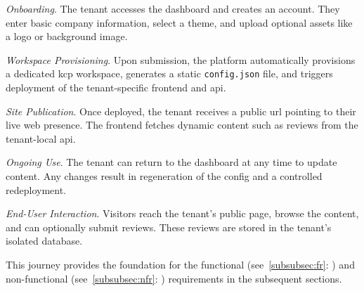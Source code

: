 \documentclass[11pt, a4paper, oneside, listof=totoc]{scrartcl}
\newcommand{\see}[1]{(see~\autoref{#1}: \textit{\nameref{#1}})}
\begin{document}
                \begin{enumerate}[label={[\arabic*]:},
                    ref=Challenge~\arabic*,
                    leftmargin=*,
                    itemsep=0.6\baselineskip]

                    \item\label{chal:ujOnboarding}
                        \textit{Onboarding}.
                        The tenant accesses the dashboard and creates an account.
                        They enter basic company information, select a theme, and upload optional
                        assets like a logo or background image.

                    \item\label{chal:ujProvisioning}
                        \textit{Workspace Provisioning}.
                        Upon submission, the platform automatically provisions a dedicated \gls{kcp}
                        workspace, generates a static \texttt{config.json} file, and triggers
                        deployment of the tenant-specific frontend and \gls{api}.

                    \item\label{chal:ujPublication}
                        \textit{Site Publication}.
                        Once deployed, the tenant receives a public \gls{url} pointing to their live
                        web presence.
                        The frontend fetches dynamic content such as reviews from the tenant-local
                        \gls{api}.

                    \item\label{chal:ujUse}
                        \textit{Ongoing Use}.
                        The tenant can return to the dashboard at any time to update content.
                        Any changes result in regeneration of the config and a controlled
                        redeployment.
                    \item\label{chal:ujInteraction}
                        \textit{End-User Interaction}.
                        Visitors reach the tenant's public page, browse the content, and can
                        optionally submit reviews.
                        These reviews are stored in the tenant's isolated database.

                \end{enumerate}
            
                This journey provides the foundation for the functional \see{subsubsec:fr} and
                non-functional \see{subsubsec:nfr} requirements in the subsequent sections.
\end{document}

